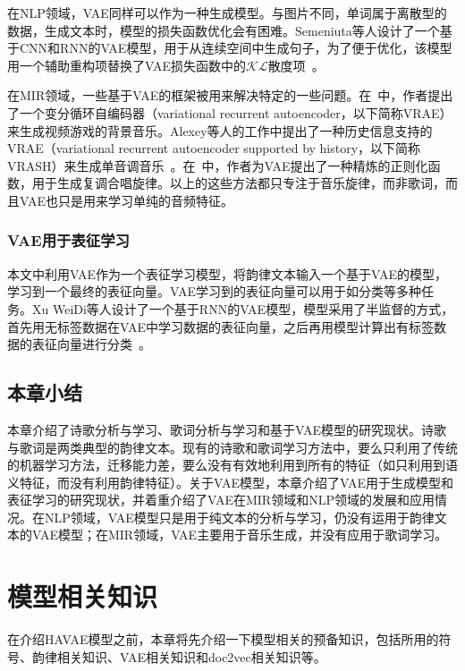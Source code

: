 在NLP领域，VAE同样可以作为一种生成模型。与图片不同，单词属于离散型的数据，生成文本时，模型的损失函数优化会有困难。Semeniuta等人设计了一个基于CNN和RNN的VAE模型，用于从连续空间中生成句子，为了便于优化，该模型用一个辅助重构项替换了VAE损失函数中的$\mathcal{KL}$散度项~\cite{semeniuta2017hybrid}。\par

在MIR领域，一些基于VAE的框架被用来解决特定的一些问题。在~\cite{fabius2014variational}中，作者提出了一个变分循环自编码器（variational recurrent autoencoder，以下简称VRAE）来生成视频游戏的背景音乐。Alexey等人的工作中提出了一种历史信息支持的VRAE（variational recurrent autoencoder supported by history，以下简称VRASH）来生成单音调音乐~\cite{alexey2017music}。在~\cite{hadjeres2017glsr}中，作者为VAE提出了一种精炼的正则化函数，用于生成复调合唱旋律。以上的这些方法都只专注于音乐旋律，而非歌词，而且VAE也只是用来学习单纯的音频特征。\par

\subsection{VAE用于表征学习}

本文中利用VAE作为一个表征学习模型，将韵律文本输入一个基于VAE的模型，学习到一个最终的表征向量。VAE学习到的表征向量可以用于如分类等多种任务。Xu WeiDi等人设计了一个基于RNN的VAE模型，模型采用了半监督的方式，首先用无标签数据在VAE中学习数据的表征向量，之后再用模型计算出有标签数据的表征向量进行分类~\cite{xu2017variational}。\par

\section{本章小结}
本章介绍了诗歌分析与学习、歌词分析与学习和基于VAE模型的研究现状。诗歌与歌词是两类典型的韵律文本。现有的诗歌和歌词学习方法中，要么只利用了传统的机器学习方法，迁移能力差，要么没有有效地利用到所有的特征（如只利用到语义特征，而没有利用韵律特征）。关于VAE模型，本章介绍了VAE用于生成模型和表征学习的研究现状，并着重介绍了VAE在MIR领域和NLP领域的发展和应用情况。在NLP领域，VAE模型只是用于纯文本的分析与学习，仍没有运用于韵律文本的VAE模型；在MIR领域，VAE主要用于音乐生成，并没有应用于歌词学习。\par

\chapter{模型相关知识} \label{chpt:prepare}
在介绍HAVAE模型之前，本章将先介绍一下模型相关的预备知识，包括所用的符号、韵律相关知识、VAE相关知识和doc2vec相关知识等。\par

